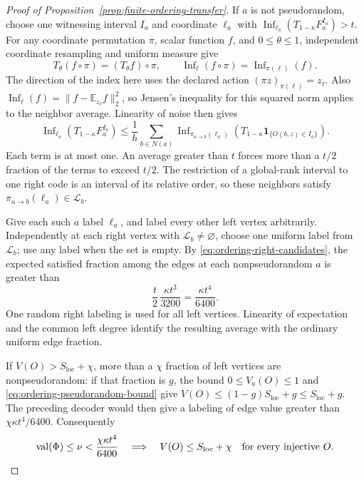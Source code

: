 \begin{proof}[Proof of Proposition~\ref{prop:finite-ordering-transfer}]
If \(a\) is not pseudorandom, choose one witnessing interval \(I_a\)
and coordinate \(\ell_a\) with
\(\operatorname{Inf}_{\ell_a}(T_{1-\kappa}F_a^{I_a})>t\).
For any coordinate permutation \(\pi\), scalar function \(f\), and
\(0\le\theta\le1\), independent coordinate resampling and uniform
measure give
\[
 T_\theta(f\circ\pi)=(T_\theta f)\circ\pi,
 \qquad
 \operatorname{Inf}_\ell(f\circ\pi)
 =\operatorname{Inf}_{\pi(\ell)}(f).
\]
The direction of the index here uses the declared action
\((\pi z)_{\pi(\ell)}=z_\ell\).  Also
\(\operatorname{Inf}_\ell(f)
=\|f-\mathbb E_{z_\ell}f\|_2^2\), so Jensen's inequality for this
squared norm applies to the neighbor average.  Linearity of noise
then gives
\begin{equation}
 \operatorname{Inf}_{\ell_a}(T_{1-\kappa}F_a^{I_a})
 \le\frac1h\sum_{b\in N(a)}
 \operatorname{Inf}_{\pi_{a\to b}(\ell_a)}
 \left(T_{1-\kappa}
       \mathbf1_{\{O(b,z)\in I_a\}}\right).
\label{eq:ordering-influence-average}
\end{equation}
Each term is at most one.  An average greater than \(t\) forces more
than a \(t/2\) fraction of the terms to exceed \(t/2\).
The restriction of a global-rank interval to one right code is an
interval of its relative order, so these neighbors satisfy
\(\pi_{a\to b}(\ell_a)\in\mathcal L_b\).

Give each such \(a\) label \(\ell_a\), and label every other left
vertex arbitrarily.  Independently at each right vertex with
\(\mathcal L_b\ne\varnothing\), choose one uniform label from
\(\mathcal L_b\); use any label when the set is empty.  By
\eqref{eq:ordering-right-candidates}, the expected satisfied fraction
among the edges at each nonpseudorandom \(a\) is greater than
\[
 \frac t2\,\frac{\kappa t^3}{3200}
 =\frac{\kappa t^4}{6400}.
\]
One random right labeling is used for all left vertices.  Linearity
of expectation and the common left degree identify the resulting
average with the ordinary uniform edge fraction.

If \(V(O)>S_{\mathrm{loc}}+\chi\), more than a \(\chi\) fraction of
left vertices are nonpseudorandom: if that fraction is \(g\), the bound
\(0\le V_a(O)\le1\) and \eqref{eq:ordering-pseudorandom-bound} give
\(V(O)\le(1-g)S_{\mathrm{loc}}+g\le S_{\mathrm{loc}}+g\).  The
preceding decoder would then give a labeling of edge value greater than
\(\chi\kappa t^4/6400\).
Consequently
\begin{equation}
 \operatorname{val}(\Phi)\le\nu<\frac{\chi\kappa t^4}{6400}
 \quad\Longrightarrow\quad
 V(O)\le S_{\mathrm{loc}}+\chi\quad\text{for every injective }O.
\label{eq:ordering-iid-soundness}
\end{equation}


\end{proof}
